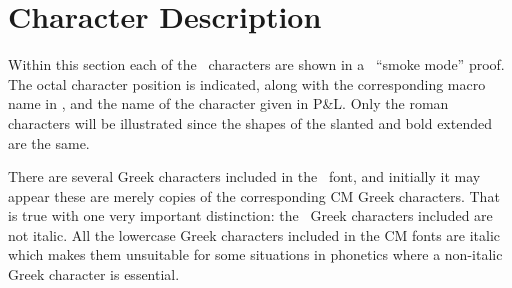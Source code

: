 \section{Character Description}

Within this section each of the \wsu\  characters are shown in a \meta\
``smoke mode'' proof. The octal character position is indicated, along with the
corresponding macro name in \ipam, and the
name of the character given in P\&L.
Only the roman characters will be illustrated since the shapes of the slanted
and bold extended are the same.

There are several Greek characters included in the \wsu\ font, and initially
it may appear these are merely copies of the corresponding CM Greek characters.
That is true with one very important distinction: the \wsu\ Greek characters
included are not italic. All the lowercase Greek characters included in
the CM fonts are italic which makes them unsuitable for some situations in
phonetics where a non-italic Greek character is essential.
\newpage
\raggedbottom
\vbox{ }

\vbox{ }

\vbox{ 
}

\vbox{}

\vbox{}

\vbox{}

\vbox{}

\vbox{}

\vbox{}

\vbox{}

\vbox{}

\vbox{}

\vbox{}

\vbox{}

\vbox{}

\vbox{}

